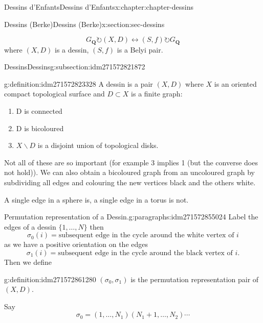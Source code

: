 \documentclass[oneside,10pt,]{book}
\numberwithin{equation}{section}
\newcommand{\QQ}{\mathbf{Q}}
\newcommand{\acts}{\circlearrowright}
\begin{document}
\begin{chapterptx}{Dessins d'Enfants}{}{Dessins d'Enfants}{}{}{x:chapter:chapter-dessins}
\begin{sectionptx}{Dessins (Berke)}{}{Dessins (Berke)}{}{}{x:section:sec-dessins}
\begin{introduction}{}%
%
\begin{equation*}
G_\QQ \acts (X,D) \leftrightarrow (S,f) \acts G_\QQ
\end{equation*}
where \((X,D)\) is a dessin, \((S,f)\) is a Belyi pair.%
\end{introduction}%
%
%
\typeout{************************************************}
\typeout{************************************************}
%
\begin{subsectionptx}{Dessins}{}{Dessins}{}{}{g:subsection:idm271572821872}
\begin{definition}{}{g:definition:idm271572823328}%
A dessin is  a pair \((X,D)\) where \(X\) is an oriented compact topological surface and \(D\subset X\) is a finite graph:%
\begin{enumerate}
\item{}D is connected%
\item{}D is bicoloured%
\item{}\(X \smallsetminus D\) is a disjoint union of topological disks.%
\end{enumerate}
%
\end{definition}
Not all of these are so important (for example 3 implies 1 (but the converse does not hold)). We can also obtain a bicoloured graph from an uncoloured graph by subdividing all edges and colouring the new vertices black and the others white.%
\par
A single edge in a sphere is, a single edge in a torus is not.%
\begin{paragraphs}{Permutation representation of a Dessin.}{g:paragraphs:idm271572855024}%
Label the edges of  a dessin \(\{1, \ldots, N\}\) then%
\begin{equation*}
\sigma_0(i) = \text{subsequent edge in the cycle around the white vertex of }i
\end{equation*}
as we have a positive orientation on the edges%
\begin{equation*}
\sigma_1(i) = \text{subsequent edge in the cycle around the black vertex of }i\text{.}
\end{equation*}
Then we define%
\begin{definition}{}{g:definition:idm271572861280}%
\((\sigma_0, \sigma_1)\) is the permutation representation pair of \((X,D)\).%
\end{definition}
Say%
\begin{equation*}
\sigma_0 = (1 , \ldots, N_1) (N_1 + 1 , \ldots, N_2)\cdots
\end{equation*}

\end{paragraphs}
\end{subsectionptx}
\end{sectionptx}
\end{chapterptx}
\end{document}
